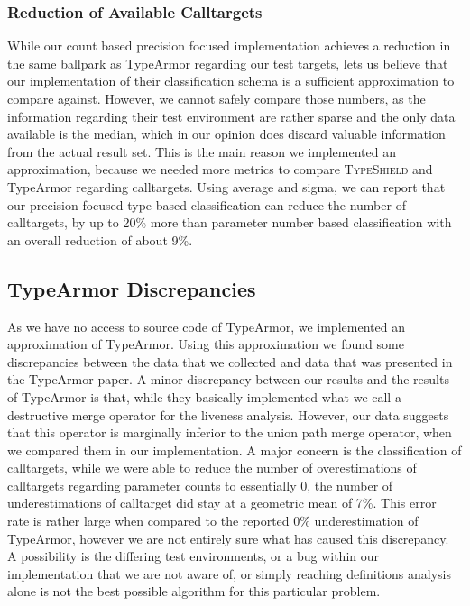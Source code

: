 \subsubsection{Reduction of Available Calltargets}
While our count based precision focused implementation achieves a reduction in the same ballpark as
TypeArmor regarding our test targets, lets us believe that our implementation of their classification
schema is a sufficient approximation to compare against. However, we cannot safely compare those numbers,
as the information regarding their test environment are rather sparse and the only data available is the
median, which in our opinion does discard valuable information from the actual result set. This is the
main reason we implemented an approximation, because we needed more metrics to compare \textsc{TypeShield}
and TypeArmor regarding calltargets. Using average and sigma, we can report that our precision focused
type based classification can reduce the number of calltargets, by up to 20\% more than parameter number
based classification with an overall reduction of about 9\%.

\subsection{TypeArmor Discrepancies}
\label{section:discrep}
As we have no access to source code of TypeArmor, we implemented an approximation
of TypeArmor. Using this approximation we found some discrepancies between the data that we collected
and data that was presented in the TypeArmor paper.
A minor discrepancy between our results and the results of TypeArmor is that, while they basically implemented
what we call a destructive merge operator for the liveness analysis. However, our data suggests that this
operator is marginally inferior to the union path merge operator, when we compared them in our implementation.
A major concern is the classification of calltargets, while we were able to reduce the number of overestimations
of calltargets regarding parameter counts to essentially 0, the number of underestimations of calltarget did
stay at a geometric mean of 7\%. This error rate is rather large when compared to the reported 0\% underestimation
of TypeArmor, however we are not entirely sure what has caused this discrepancy. A possibility is the differing
test environments, or a bug within our implementation that we are not aware of, or simply reaching definitions
analysis alone is not the best possible algorithm for this particular problem.

